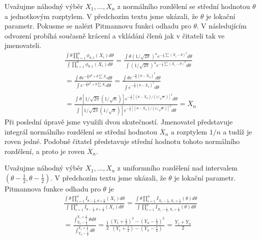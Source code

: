 \begin{example}
Uvažujme náhodný výběr $X_1, ..., X_n$ z normálního rozdělení se střední hodnotou $\theta$ a jednotkovým rozptylem. V předchozím textu jsme ukázali, že $\theta$ je lokační parametr. Pokusme se nalézt Pitmannovu funkci odhadu pro $\theta$.
V následujícím odvození probíhá současně krácení a vkládání členů jak v čitateli tak ve jmenovateli.
\begin{gather*}
\frac{\int \theta \prod_{i = 1}^n \phi_{\theta, 1}(X_i)d \theta}{\int \prod_{i = 1}^n \phi_{\theta, 1}(X_i) d \theta} = \frac{\int \theta (1 / \sqrt{2 \pi})^n e^{-\frac{1}{2} \sum (X_i - \theta)^2}d \theta}{\int (1 / \sqrt{2 \pi})^n e^{-\frac{1}{2}\sum(X_i - \theta)^2} d \theta}\\
= \frac{\int \theta e^{-\frac{n}{2}\theta^2 + \theta \sum X_i}d\theta}{\int e^{-\frac{n}{2}\theta^2 + \theta \sum X_i}d \theta} = \frac{\int \theta e^{-\frac{n}{2}(\theta - \overline{X}_n)^2} d \theta}{\int e^{-\frac{n}{2}(\theta - \overline{X}_n)^2} d \theta}\\
= \frac{\int \theta[1/\sqrt{2 \pi}(1 / \sqrt{n})]e^{-\frac{1}{2}[(\theta - \overline{X}_n)/(1 / \sqrt{n})]^2} d \theta}{\int [1/\sqrt{2 \pi}(1/\sqrt{n})]e^{-\frac{1}{2}[(\theta - \overline{X_n})/(1/\sqrt{n})]^2} d \theta} = \overline{X}_n
\end{gather*}
Při poslední úpravě jsme využili dvou skutečností. Jmenovatel představuje integrál normálního rozdělení se střední hodnotou $\overline{X}_n$ a rozptylem $1/n$ a tudíž je roven jedné. Podobně čitatel představuje střední hodnotu tohoto normálního rozdělení, a proto je roven $\overline{X}_n$.
\end{example}

\begin{example}
Uvažujme náhodný výběr $X_1, ..., X_n$ z uniformního rozdělení nad intervalem $(\theta - \frac{1}{2}, \theta - \frac{1}{2})$. V předchozím textu jsme ukázali, že $\theta$ je lokační parametr. Pitmannova funkce odhadu pro $\theta$ je
\begin{gather*}
\frac{\int \theta \prod_{i = 1}^n I_{\theta - \frac{1}{2}, \theta + \frac{1}{2}}(X_i) d \theta}{\int \prod_{i = 1}^n I_{\theta - \frac{1}{2}, \theta + \frac{1}{2}}(X_i) d \theta} = \frac{\int \theta \prod_{i = 1}^n I_{X_i - \frac{1}{2}, X_i + \frac{1}{2}}(\theta) d \theta}{\int \prod_{i = 1}^n I_{X_i - \frac{1}{2}, X_i + \frac{1}{2}}(\theta) d \theta}\\
= \frac{\int_{Y_n - \frac{1}{2}}^{Y_1 + \frac{1}{2}}\theta d \theta}{\int_{Y_n - \frac{1}{2}}^{Y_1 + \frac{1}{2}} d \theta} = \frac{1}{2} \frac{(Y_1 + \frac{1}{2})^2 - (Y_n - \frac{1}{2})^2}{(Y_1 + \frac{1}{2}) - (Y_n - \frac{1}{2})} = \frac{Y_1 + Y_n}{2}
\end{gather*}
\end{example}

